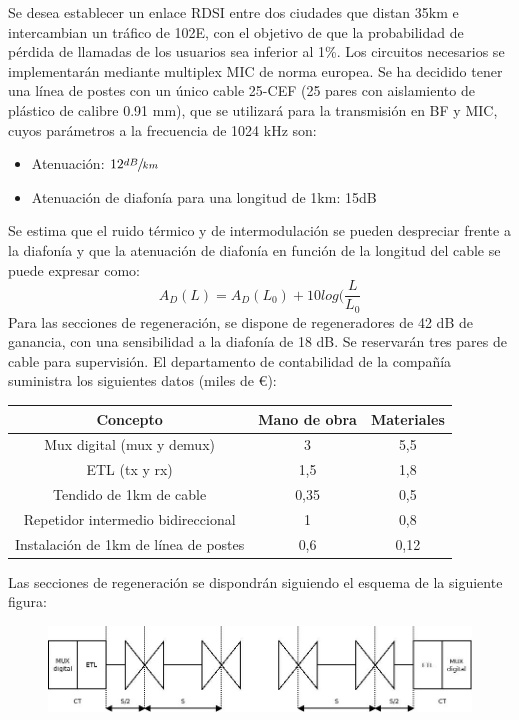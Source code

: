 \begin{exercise}[7]
	Se desea establecer un enlace RDSI entre dos ciudades que distan 35km e intercambian un tráfico de 102E, con el objetivo de que la probabilidad de pérdida de llamadas de los usuarios sea inferior al 1\%. Los circuitos necesarios se implementarán mediante multiplex MIC de norma europea. Se ha decidido tener una línea de postes con un único cable 25-CEF (25 pares con aislamiento de plástico de calibre 0.91 mm), que se utilizará para la transmisión en BF y MIC, cuyos parámetros a la frecuencia de 1024 kHz son:
	\begin{itemize}
		\item Atenuación: $12\sfrac{dB}{km}$
		\item Atenuación de diafonía para una longitud de 1km: 15dB
	\end{itemize}
	Se estima que el ruido térmico y de intermodulación se pueden despreciar frente a la diafonía y que la atenuación de diafonía en función de la longitud del cable se puede expresar como:
	\[A_D(L)=A_D(L_0)+10log(\frac{L}{L_0}\]
	Para las secciones de regeneración, se dispone de regeneradores de 42 dB de ganancia, con una sensibilidad a la diafonía de 18 dB. Se reservarán tres pares de cable para supervisión. El departamento de contabilidad de la compañía suministra los siguientes datos (miles de €):
	\begin{center}
	\begin{tabular}{c c c}
		\hline
		\textbf{Concepto} & \textbf{Mano de obra} & \textbf{Materiales}\\\hline
		Mux digital (mux y demux) & 3 & 5,5\\
		ETL (tx y rx) & 1,5 & 1,8\\
		Tendido de 1km de cable & 0,35 & 0,5\\
		Repetidor intermedio bidireccional & 1 & 0,8\\
		Instalación de 1km de línea de postes & 0,6 & 0,12\\\hline
	\end{tabular}
	\end{center}
	Las secciones de regeneración se dispondrán siguiendo el esquema de la siguiente figura:
	\begin{figure}[htp]
	\centering
	\includegraphics[width=\textwidth]{Imagen/ejercicio7tema3.jpg}

\end{figure}
\end{exercise}
